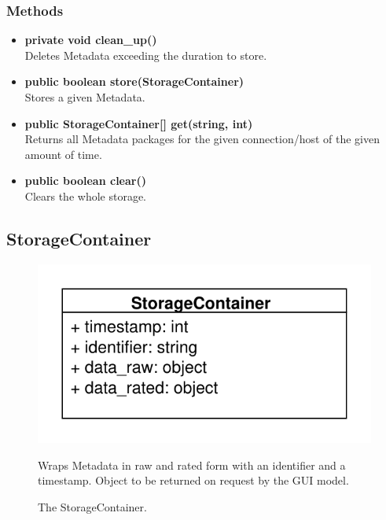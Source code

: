 \subsubsection{Methods}
\begin{itemize}
	\item \textbf{private void clean\_up()}\\
	Deletes Metadata exceeding the duration to store.
	\item \textbf{public boolean store(StorageContainer)}\\
	Stores a given Metadata.
	\item \textbf{public StorageContainer[] get(string, int)}\\
	Returns all Metadata packages for the given connection/host of the given amount of time.
	\item \textbf{public boolean clear()}\\
	Clears the whole storage.
\end{itemize}

\newpage
\subsection{StorageContainer}
\begin{figure}[htbp]
	\begin{minipage}[t]{7cm}
		\vspace{0pt}
		\centering
		\includegraphics[scale=0.6]{./diagram_pictures/StorageContainer.pdf}
		\caption{The StorageContainer.}
	\end{minipage}
	\hfill
	\begin{minipage}[t]{8cm}
		\vspace{10pt}
		Wraps Metadata in raw and rated form with an identifier and a timestamp. Object to be returned on request by the GUI model.
	\end{minipage}
\end{figure}

